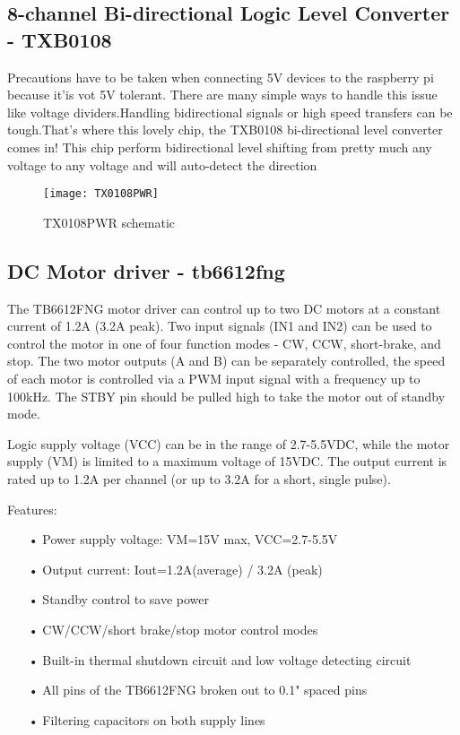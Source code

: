\documentclass[
12pt, %
a4paper, %
oneside, %
headinclude,footinclude, %
BCOR5mm, %
]{scrartcl}
\begin{document}
\subsection{8-channel Bi-directional Logic Level Converter - TXB0108}
Precautions have to be taken when connecting 5V devices to the raspberry pi because it'is vot 5V tolerant. There are many simple ways to handle this issue like voltage dividers.Handling bidirectional signals or high speed transfers can be tough.That's where this lovely chip, the TXB0108 bi-directional level converter comes in! This chip perform bidirectional level shifting from pretty much any voltage to any voltage and will auto-detect the direction 

\begin{figure}[!htb]
\centering
\texttt{[image: TX0108PWR]} 
\caption[TX0108PWR schematic]{TX0108PWR schematic}
\label{fig:TX0108PWR}
\end{figure}

\subsection {DC Motor driver - tb6612fng}
The TB6612FNG motor driver can control up to two DC motors at a constant current of 1.2A (3.2A peak). Two input signals (IN1 and IN2) can be used to control the motor in one of four function modes - CW, CCW, short-brake, and stop. The two motor outputs (A and B) can be separately controlled, the speed of each motor is controlled via a PWM input signal with a frequency up to 100kHz. The STBY pin should be pulled high to take the motor out of standby mode.

Logic supply voltage (VCC) can be in the range of 2.7-5.5VDC, while the motor supply (VM) is limited to a maximum voltage of 15VDC. The output current is rated up to 1.2A per channel (or up to 3.2A for a short, single pulse).

Features:
\begin{itemize}
\item[•] Power supply voltage: VM=15V max, VCC=2.7-5.5V
\item[•] Output current: Iout=1.2A(average) / 3.2A (peak)
\item[•] Standby control to save power
\item[•] CW/CCW/short brake/stop motor control modes
\item[•] Built-in thermal shutdown circuit and low voltage detecting circuit
\item[•] All pins of the TB6612FNG broken out to 0.1" spaced pins
\item[•] Filtering capacitors on both supply lines
\end{itemize}
\end{document}
